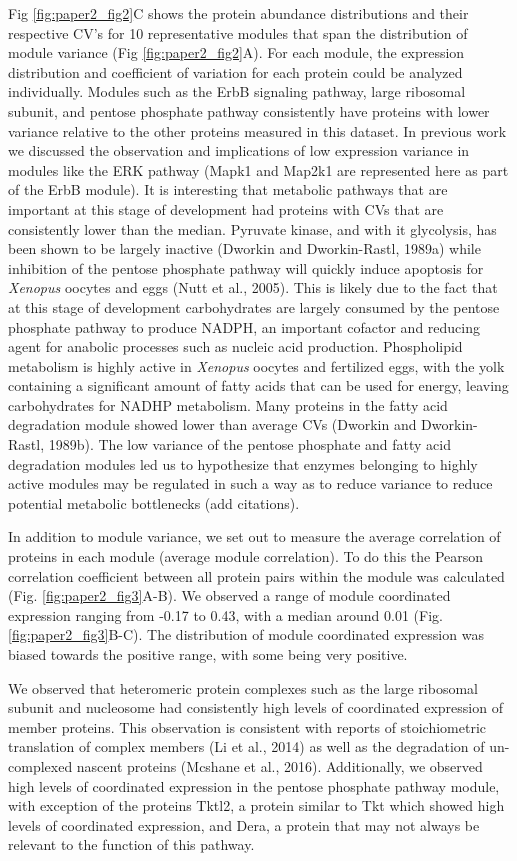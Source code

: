 Fig \ref{fig:paper2_fig2}C shows the protein abundance distributions and their respective CV’s for 10 representative modules that span the distribution of module variance (Fig \ref{fig:paper2_fig2}A). For each module, the expression distribution and coefficient of variation for each protein could be analyzed individually. Modules such as the ErbB signaling pathway, large ribosomal subunit, and pentose phosphate pathway consistently have proteins with lower variance relative to the other proteins measured in this dataset. In previous work we discussed the observation and implications of low expression variance in modules like the ERK pathway (Mapk1 and Map2k1 are represented here as part of the ErbB module). It is interesting that metabolic pathways that are important at this stage of development had proteins with CVs that are consistently lower than the median. Pyruvate kinase, and with it glycolysis, has been shown to be largely inactive (Dworkin and Dworkin-Rastl, 1989a) while inhibition of the pentose phosphate pathway will quickly induce apoptosis for \emph{Xenopus} oocytes and eggs (Nutt et al., 2005). This is likely due to the fact that at this stage of development carbohydrates are largely consumed by the pentose phosphate pathway to produce NADPH, an important cofactor and reducing agent for anabolic processes such as nucleic acid production. Phospholipid metabolism is highly active in \emph{Xenopus} oocytes and fertilized eggs, with the yolk containing a significant amount of fatty acids that can be used for energy, leaving carbohydrates for NADHP metabolism. Many proteins in the fatty acid degradation module showed lower than average CVs (Dworkin and Dworkin-Rastl, 1989b). The low variance of the pentose phosphate and fatty acid degradation modules led us to hypothesize that enzymes belonging to highly active modules may be regulated in such a way as to reduce variance to reduce potential metabolic bottlenecks (add citations).

In addition to module variance, we set out to measure the average correlation of proteins in each module (average module correlation). To do this the Pearson correlation coefficient between all protein pairs within the module was calculated (Fig. \ref{fig:paper2_fig3}A-B). We observed a range of module coordinated expression ranging from -0.17 to 0.43, with a median around 0.01 (Fig. \ref{fig:paper2_fig3}B-C). The distribution of module coordinated expression was biased towards the positive range, with some being very positive. 

We observed that heteromeric protein complexes such as the large ribosomal subunit and nucleosome had consistently high levels of coordinated expression of member proteins. This observation is consistent with reports of stoichiometric translation of complex members (Li et al., 2014) as well as the degradation of un-complexed nascent proteins (Mcshane et al., 2016). Additionally, we observed high levels of coordinated expression in the pentose phosphate pathway module, with exception of the proteins Tktl2, a protein similar to Tkt which showed high levels of coordinated expression, and Dera, a protein that may not always be relevant to the function of this pathway. 

